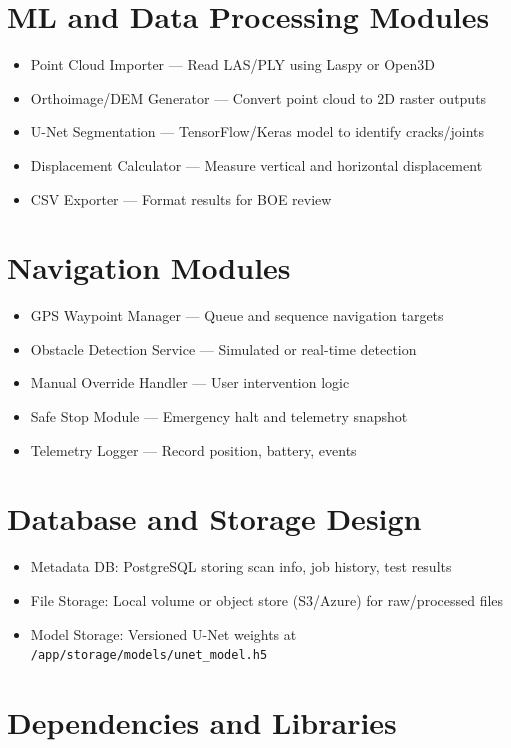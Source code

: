\documentclass{article}
\begin{document}
\section{ML and Data Processing Modules}
\begin{itemize}
  \item Point Cloud Importer — Read LAS/PLY using Laspy or Open3D
  \item Orthoimage/DEM Generator — Convert point cloud to 2D raster outputs
  \item U-Net Segmentation — TensorFlow/Keras model to identify cracks/joints
  \item Displacement Calculator — Measure vertical and horizontal displacement
  \item CSV Exporter — Format results for BOE review
\end{itemize}

\section{Navigation Modules}
\begin{itemize}
  \item GPS Waypoint Manager — Queue and sequence navigation targets
  \item Obstacle Detection Service — Simulated or real-time detection
  \item Manual Override Handler — User intervention logic
  \item Safe Stop Module — Emergency halt and telemetry snapshot
  \item Telemetry Logger — Record position, battery, events
\end{itemize}

\section{Database and Storage Design}
\begin{itemize}
  \item Metadata DB: PostgreSQL storing scan info, job history, test results
  \item File Storage: Local volume or object store (S3/Azure) for raw/processed files
  \item Model Storage: Versioned U-Net weights at \texttt{/app/storage/models/unet\_model.h5}
\end{itemize}

\section{Dependencies and Libraries}
\end{document}
